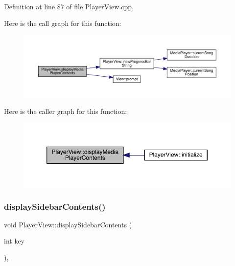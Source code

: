 Definition at line 87 of file Player\+View.\+cpp.

Here is the call graph for this function\+:
\nopagebreak
\begin{figure}[H]
\begin{center}
\leavevmode
\includegraphics[width=350pt]{class_player_view_a1591b9bb3c762bc45af4aa2f35cb9c11_cgraph}
\end{center}
\end{figure}
Here is the caller graph for this function\+:
\nopagebreak
\begin{figure}[H]
\begin{center}
\leavevmode
\includegraphics[width=350pt]{class_player_view_a1591b9bb3c762bc45af4aa2f35cb9c11_icgraph}
\end{center}
\end{figure}
\mbox{\label{class_player_view_ab0056b8fbbab777cc0559425496f89c9}} 
\subsubsection{\texorpdfstring{display\+Sidebar\+Contents()}{displaySidebarContents()}}
{\footnotesize\ttfamily void Player\+View\+::display\+Sidebar\+Contents (\begin{DoxyParamCaption}\item[{int}]{key }\end{DoxyParamCaption})\hspace{0.3cm}{\ttfamily [inline]}, {\ttfamily [private]}}



